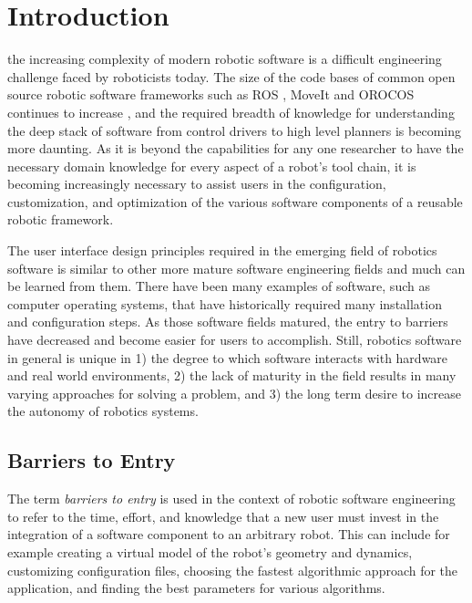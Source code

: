 \documentclass[10pt,journal,compsoc]{joser1}
\begin{document}
\section{Introduction}
 {the increasing complexity of modern robotic software is a difficult engineering challenge faced by roboticists today. The size of the code bases of common open source robotic software frameworks such as ROS \cite{quigley2009ros}, MoveIt \cite{moveit} and OROCOS \cite{bruyninckx2001open} continues to increase \cite{makarenko2007benefits}, and the required breadth of knowledge for understanding the deep stack of software from control drivers to high level planners is becoming more daunting. As it is beyond the capabilities for any one researcher to have the necessary domain knowledge for every aspect of a robot's tool chain, it is becoming increasingly necessary to assist users in the configuration, customization, and optimization of the various software components of a reusable robotic framework. 

The user interface design principles required in the emerging field of robotics software is similar to other more mature software engineering fields and much can be learned from them. There have been many examples of software, such as computer operating systems, that have historically required many installation and configuration steps. As those software fields matured, the entry to barriers have decreased and become easier for users to accomplish. Still, robotics software in general is unique in 1) the degree to which software interacts with hardware and real world environments, 2) the lack of maturity in the field results in many varying approaches for solving a problem, and 3) the long term desire to increase the autonomy of robotics systems. 

\subsection{Barriers to Entry}

The term \textit{barriers to entry} is used in the context of robotic software engineering to refer to the time, effort, and knowledge that a new user must invest in the integration of a software component to an arbitrary robot. This can include for example creating a virtual model of the robot's geometry and dynamics, customizing configuration files, choosing the fastest algorithmic approach for the application, and finding the best parameters for various algorithms. 

}
\end{document}
